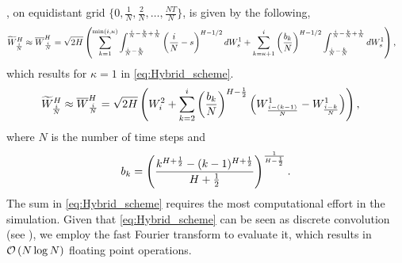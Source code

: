 ,  on equidistant grid $\{0,\frac{1}{N},\frac{2}{N},\dots,\frac{NT}{N}\}$, is given by 
the following,
\begin{align}\label{eq:Hybrid_scheme_pre}
\widetilde{W}^H_{\frac{i}{N}} \approx \overline{W}^H_{\frac{i}{N}}&= \sqrt{2H} \left(  \sum_{k=1}^{\min(i,\kappa)} \int_{\frac{i}{N}-\frac{k}{N}}^{\frac{i}{N}-\frac{k}{N}+\frac{1}{N}} \left(\frac{i}{N}-s\right)^{H - 1/2} dW^1_s+\sum_{k=\kappa+1}^{i} \left(\frac{b_k}{N}\right)^{H - 1/2}  \int_{\frac{i}{N}-\frac{k}{N}}^{\frac{i}{N}-\frac{k}{N}+\frac{1}{N}} dW^1_s \right) ,
\end{align}
which results for $\kappa=1$  in \eqref{eq:Hybrid_scheme}.
\begin{align}\label{eq:Hybrid_scheme}
\widetilde{W}^H_{\frac{i}{N}} \approx \overline{W}^H_{\frac{i}{N}}&= \sqrt{2H} \left(  W^2_i+\sum_{k=2}^{i} \left(\frac{b_k}{N}\right)^{H-\frac{1}{2}} \left(W_{\frac{i-(k-1)}{N}}^1-W_{\frac{i-k}{N}}^1\right)\right),
\end{align}
where $N$ is the number of time steps and 
$$ b_k=\left(\frac{k^{H+\frac{1}{2}}-(k-1)^{H+\frac{1}{2} }}{H+\frac{1}{2}}\right)^{\frac{1}{H-\frac{1}{2}}} .$$
The sum in \eqref{eq:Hybrid_scheme} requires the most computational effort in the simulation. Given that \eqref{eq:Hybrid_scheme} can be seen as discrete convolution  (see \cite{bennedsen2017hybrid}), we employ the fast Fourier transform to evaluate it, which results in  ${\mathcal{O}}\left(N \log N\right)$ floating point operations.

